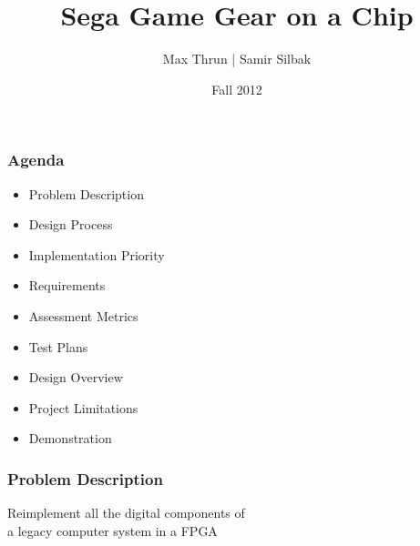 \documentclass[xcolor=table]{beamer}
\title{Sega Game Gear on a Chip}
\author{Max Thrun | Samir Silbak}
\institute{University of Cincinnati}
\date{Fall 2012}
\newlength{\wideitemsep}
\let\olditem\item
\renewcommand{\item}{\setlength{\itemsep}{\wideitemsep}\olditem}
\begin{document}
\maketitle

%
%

\begin{frame}
\frametitle{Agenda}
    \begin{itemize}
        \olditem Problem Description
        \olditem Design Process
        \olditem Implementation Priority
        \olditem Requirements
        \olditem Assessment Metrics
        \olditem Test Plans
        \olditem Design Overview
        \olditem Project Limitations
        \olditem Demonstration
    \end{itemize}
\end{frame}

\begin{frame}
    \frametitle{Problem Description}
    \begin{center}
        \Large
        Reimplement all the digital components of \\a legacy computer system in a FPGA
    \end{center}
\end{frame}
\end{document}
